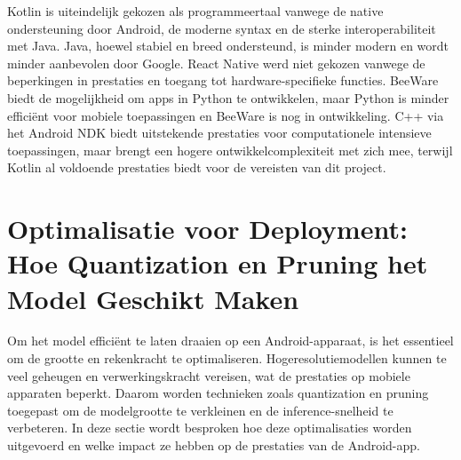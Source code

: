 Kotlin is uiteindelijk gekozen als programmeertaal vanwege de native ondersteuning door Android, de moderne syntax en de sterke interoperabiliteit met Java. 
Java, hoewel stabiel en breed ondersteund, is minder modern en wordt minder aanbevolen door Google. 
React Native werd niet gekozen vanwege de beperkingen in prestaties en toegang tot hardware-specifieke functies. 
BeeWare biedt de mogelijkheid om apps in Python te ontwikkelen, maar Python is minder efficiënt voor mobiele toepassingen en BeeWare is nog in ontwikkeling. 
C++ via het Android NDK biedt uitstekende prestaties voor computationele intensieve toepassingen, maar brengt een hogere ontwikkelcomplexiteit met zich mee, terwijl Kotlin al voldoende prestaties biedt voor de vereisten van dit project.


\section{Optimalisatie voor Deployment: Hoe Quantization en Pruning het Model Geschikt Maken}
Om het model efficiënt te laten draaien op een Android-apparaat, is het essentieel om de grootte en rekenkracht te optimaliseren. 
Hogeresolutiemodellen kunnen te veel geheugen en verwerkingskracht vereisen, wat de prestaties op mobiele apparaten beperkt. 
Daarom worden technieken zoals quantization en pruning toegepast om de modelgrootte te verkleinen en de inference-snelheid te verbeteren. 
In deze sectie wordt besproken hoe deze optimalisaties worden uitgevoerd en welke impact ze hebben op de prestaties van de Android-app.
\\
\\

